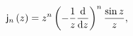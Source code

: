 \[\mathsf{j}_{n}\left(z\right)=z^{n}\left(-\frac{1}{z}\frac{\mathrm{d}}{\mathrm{%
d}z}\right)^{n}\frac{\sin z}{z},\]